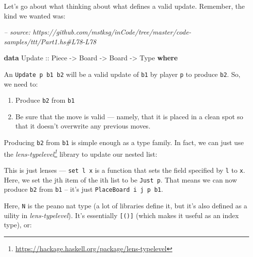 \documentclass[]{article}
\newenvironment{Shaded}{}{}
\newcommand{\CommentTok}[1]{\textcolor[rgb]{0.38,0.63,0.69}{\textit{#1}}}
\newcommand{\DataTypeTok}[1]{\textcolor[rgb]{0.56,0.13,0.00}{#1}}
\newcommand{\FunctionTok}[1]{\textcolor[rgb]{0.02,0.16,0.49}{#1}}
\newcommand{\KeywordTok}[1]{\textcolor[rgb]{0.00,0.44,0.13}{\textbf{#1}}}
\newcommand{\NormalTok}[1]{#1}
\newcommand{\OtherTok}[1]{\textcolor[rgb]{0.00,0.44,0.13}{#1}}
\renewcommand{\href}[2]{#2\footnote{\url{#1}}}
\begin{document}
Let's go about what thinking about what defines a valid update. Remember, the
kind we wanted was:

\begin{Shaded}
\begin{Highlighting}[]
\CommentTok{-- source: https://github.com/mstksg/inCode/tree/master/code-samples/ttt/Part1.hs#L78-L78}

\KeywordTok{data} \DataTypeTok{Update}\OtherTok{ ::} \DataTypeTok{Piece} \OtherTok{->} \DataTypeTok{Board} \OtherTok{->} \DataTypeTok{Board} \OtherTok{->} \DataTypeTok{Type} \KeywordTok{where}
\end{Highlighting}
\end{Shaded}

An \texttt{Update\ p\ b1\ b2} will be a valid update of \texttt{b1} by player
\texttt{p} to produce \texttt{b2}. So, we need to:

\begin{enumerate}
\def\labelenumi{\arabic{enumi}.}
\tightlist
\item
  Produce \texttt{b2} from \texttt{b1}
\item
  Be sure that the move is valid --- namely, that it is placed in a clean spot
  so that it doesn't overwrite any previous moves.
\end{enumerate}

Producing \texttt{b2} from \texttt{b1} is simple enough as a type family. In
fact, we can just use the
\emph{\href{https://hackage.haskell.org/package/lens-typelevel}{lens-typelevel}}
library to update our nested list:

\begin{Shaded}
\end{Shaded}

This is just lenses --- \texttt{set\ l\ x} is a function that sets the field
specified by \texttt{l} to \texttt{x}. Here, we set the jth item of the ith list
to be \texttt{Just\ p}. That means we can now produce \texttt{b2} from
\texttt{b1} -- it's just \texttt{PlaceBoard\ i\ j\ p\ b1}.

Here, \texttt{N} is the peano nat type (a lot of libraries define it, but it's
also defined as a uility in \emph{lens-typelevel}). It's essentially
\texttt{{[}(){]}} (which makes it useful as an index type), or:
\end{document}
